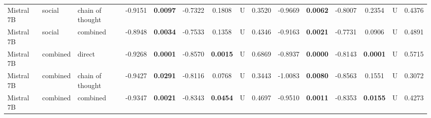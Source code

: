 \begin{center}
\begin{longtable}{@{}lll|cccccc|cccccc@{}}
        Mistral 7B & social & chain of thought & -0.9151 & \textbf{0.0097} & -0.7322 & 0.1808 & U & 0.3520 & -0.9669 & \textbf{0.0062} & -0.8007 & 0.2354 & U & 0.4376 \\
        Mistral 7B & social & combined & -0.8948 & \textbf{0.0034} & -0.7533 & 0.1358 & U & 0.4346 & -0.9163 & \textbf{0.0021} & -0.7731 & 0.0906 & U & 0.4891 \\
        Mistral 7B & combined & direct & -0.9268 & \textbf{0.0001} & -0.8570 & \textbf{0.0015} & U & 0.6869 & -0.8937 & \textbf{0.0000} & -0.8143 & \textbf{0.0001} & U & 0.5715 \\
        Mistral 7B & combined & chain of thought & -0.9427 & \textbf{0.0291} & -0.8116 & 0.0768 & U & 0.3443 & -1.0083 & \textbf{0.0080} & -0.8563 & 0.1551 & U & 0.3072 \\
        \rowcolor{gray!20} Mistral 7B & combined & combined & -0.9347 & \textbf{0.0021} & -0.8343 & \textbf{0.0454} & U & 0.4697 & -0.9510 & \textbf{0.0011} & -0.8353 & \textbf{0.0155} & U & 0.4273 \\


\end{longtable}
\end{center}

